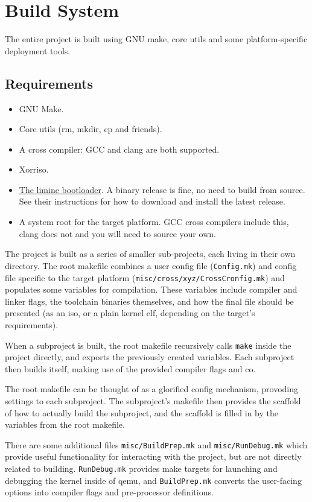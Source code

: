 \section{Build System}
\label{Build System}
The entire project is built using GNU make, core utils and some platform-specific deployment tools. 

\subsection{Requirements}
\begin{itemize}
    \item GNU Make.
    \item Core utils (rm, mkdir, cp and friends).
    \item A cross compiler: GCC and clang are both supported.
    \item Xorriso.
    \item \href{https://github.com/limine-bootloader/limine}{The limine bootloader}. A binary release is fine, no need to build from source. See their instructions for how to download and install the latest release.
    \item A system root for the target platform. GCC cross compilers include this, clang does not and you will need to source your own.
\end{itemize}

The project is built as a series of smaller sub-projects, each living in their own directory. The root makefile combines a user config file (\verb|Config.mk|) and config file specific to the target platform (\verb|misc/cross/xyz/CrossCronfig.mk|) and populates some variables for compilation. These variables include compiler and linker flags, the toolchain binaries themselves, and how the final file should be presented (as an iso, or a plain kernel elf, depending on the target's requirements).

When a subproject is built, the root makefile recursively calls \verb|make| inside the project directly, and exports the previously created variables. Each subproject then builds itself, making use of the provided compiler flags and co.

The root makefile can be thought of as a glorified config mechanism, provoding settings to each subproject. The subproject's makefile then provides the scaffold of how to actually build the subproject, and the scaffold is filled in by the variables from the root makefile.

There are some additional files \verb|misc/BuildPrep.mk| and \verb|misc/RunDebug.mk| which provide useful functionality for interacting with the project, but are not directly related to building. \verb|RunDebug.mk| provides make targets for launching and debugging the kernel inside of qemu, and \verb|BuildPrep.mk| converts the user-facing options into compiler flags and pre-processor definitions.

